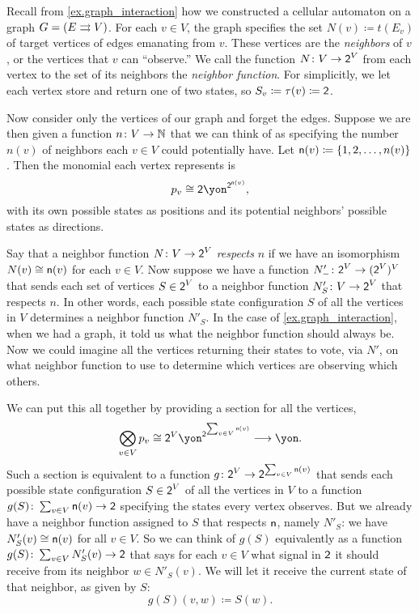 \documentclass[Book-Poly]{subfiles}
\begin{document}
\begin{example}\label{ex.cell_auto_vote_interaction}
Recall from \cref{ex.graph_interaction} how we constructed a cellular automaton on a graph $G=(E\rightrightarrows V)$.
For each $v\in V$, the graph specifies the set $N(v)\coloneqq t(E_v)$ of target vertices of edges emanating from $v$.
These vertices are the \emph{neighbors} of $v$, or the vertices that $v$ can ``observe.''
We call the function $N\colon V\to\textsf{2}^V$ from each vertex to the set of its neighbors the \emph{neighbor function}.
For simplicitly, we let each vertex store and return one of two states, so $S_v\coloneqq\tau(v)\coloneqq\textsf{2}$.

Now consider only the vertices of our graph and forget the edges.
Suppose we are then given a function $n\colon V\to\mathbb{N}$ that we can think of as specifying the number $n(v)$ of neighbors each $v\in V$ could potentially have.
Let $\mathsf{n}(v)\coloneqq\{1,2,\ldots,n(v)\}$.
Then the monomial each vertex represents is
\[
    p_v\iso\2\yon^{\2^{\ord{n}(v)}},
\]
with its own possible states as positions and its potential neighbors' possible states as directions.

Say that a neighbor function $N\colon V\to\textsf{2}^V$ \emph{respects} $n$ if we have an isomorphism $N(v)\cong\mathsf{n}(v)$ for each $v\in V$.
Now suppose we have a function $N'_-\colon \textsf{2}^V\to (\textsf{2}^V)^V$ that sends each set of vertices $S\in\textsf{2}^V$ to a neighbor function $N'_S\colon V\to \textsf{2}^V$ that respects $n$.
In other words, each possible state configuration $S$ of all the vertices in $V$ determines a neighbor function $N'_S$.
In the case of \cref{ex.graph_interaction}, when we had a graph, it told us what the neighbor function should always be.
Now we could imagine all the vertices returning their states to vote, via $N'$, on what neighbor function to use to determine which vertices are observing which others.

We can put this all together by providing a section for all the vertices,
\begin{equation}\label{eqn.polymap_misc9237}
    \bigotimes_{v\in V}p_v\cong\2^V\yon^{\2^{\sum_{v\in V}\ord{n}(v)}}\too\yon.
\end{equation}
Such a section is equivalent to a function $g\colon \textsf{2}^V\to\textsf{2}^{\sum_{v\in V}\mathsf{n}(v)}$ that sends each possible state configuration $S\in\textsf{2}^V$ of all the vertices in $V$ to a function $g(S)\colon\sum_{v\in V}\mathsf{n}(v)\to\textsf{2}$ specifying the states every vertex observes.
But we already have a neighbor function assigned to $S$ that respects $\mathsf{n}$, namely $N'_S$: we have $N'_S(v)\cong\mathsf{n}(v)$ for all $v\in V$.
So we can think of $g(S)$ equivalently as a function $g(S)\colon\sum_{v\in V}N'_S(v)\to\textsf{2}$ that says for each $v\in V$ what signal in $\textsf{2}$ it should receive from its neighbor $w\in N'_S(v)$.
We will let it receive the current state of that neighbor, as given by $S$:
\[
    g(S)(v,w)\coloneqq S(w).
\]


\end{example}
\end{document}
